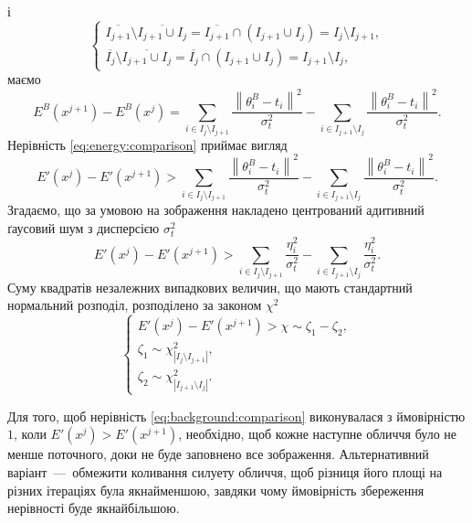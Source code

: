 і
\begin{equation*}
  \begin{cases}
    \overline{I_{j+1}} \setminus \overline{I_{j+1} \cup I_j}
    = \overline{I_{j+1}} \cap \left( I_{j+1} \cup I_j \right)
    = I_{j} \setminus I_{j+1}, \\
    \overline{I_{j}} \setminus \overline{I_{j+1} \cup I_j}
    = \overline{I_{j}} \cap \left( I_{j+1} \cup I_j \right)
    = I_{j+1} \setminus I_{j},
  \end{cases}
\end{equation*}
маємо
\begin{equation*}
  E^B\left( x^{j+1} \right) - E^B\left( x^j \right)
  = \sum_{i \in I_j \setminus I_{j+1}} \frac{\left\| \theta_i^B - t_i \right\|^2}{\sigma^2_t}
    - \sum_{i \in I_{j+1} \setminus I_j} \frac{\left\| \theta_i^B - t_i \right\|^2}{\sigma^2_t}.
\end{equation*}
Нерівність \eqref{eq:energy:comparison} приймає вигляд
\begin{equation*}
  E'\left( x^j \right) - E'\left( x^{j+1} \right)
  > \sum_{i \in I_j \setminus I_{j+1}} \frac{\left\| \theta_i^B - t_i \right\|^2}{\sigma^2_t}
    - \sum_{i \in I_{j+1} \setminus I_j} \frac{\left\| \theta_i^B - t_i \right\|^2}{\sigma^2_t}.
\end{equation*}
Згадаємо, що за умовою на зображення накладено
центрований адитивний ґаусовий шум з дисперсією $\sigma^2_t$
\begin{equation*}
  E'\left( x^j \right) - E'\left( x^{j+1} \right)
  > \sum_{i \in I_j \setminus I_{j+1}} \frac{\eta_i^2}{\sigma^2_t}
    - \sum_{i \in I_{j+1} \setminus I_j} \frac{\eta_i^2}{\sigma^2_t}.
\end{equation*}
Суму квадратів незалежних випадкових величин,
що мають стандартний нормальний розподіл,
розподілено за законом $\chi^2$
\begin{equation}\label{eq:background:comparison}
  \begin{cases}
    E'\left( x^j \right) - E'\left( x^{j+1} \right)
    > \chi \sim \zeta_1 - \zeta_2, \\
    \zeta_1 \sim \chi^2_{\left| I_j \setminus I_{j+1} \right|}, \\
    \zeta_2 \sim \chi^2_{\left| I_{j+1} \setminus I_j \right|}.
  \end{cases}
\end{equation}

Для того, щоб нерівність \eqref{eq:background:comparison}
виконувалася з ймовірністю $1$,
коли $E'\left( x^j \right) > E'\left( x^{j+1} \right)$,
необхідно, щоб кожне наступне обличчя було не менше поточного,
доки не буде заповнено все зображення.
Альтернативний варіант~---~обмежити коливання силуету обличчя,
щоб різниця його площі на різних ітераціях була якнайменшою,
завдяки чому ймовірність збереження нерівності буде якнайбільшою.

